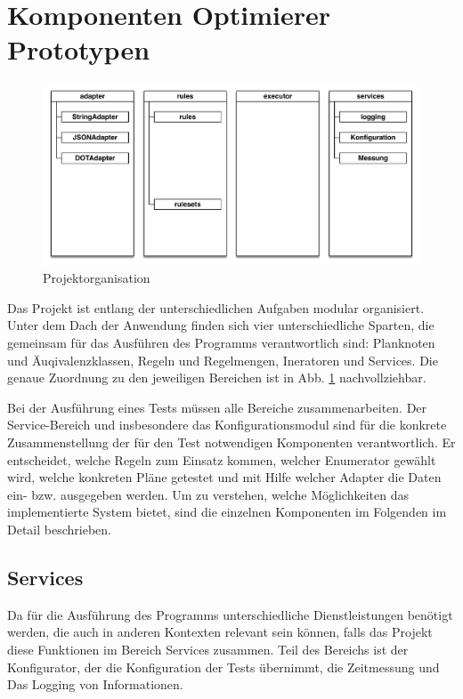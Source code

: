 \section{Komponenten Optimierer Prototypen}




\begin{figure}[ht]
  \centering
  \includegraphics[width=\textwidth]{04_Implementierung/00_media/Organization.pdf}
  \caption{Projektorganisation}
  \label{ProjectOrga}
\end{figure}


Das Projekt ist entlang der unterschiedlichen Aufgaben modular organisiert. Unter dem Dach der Anwendung finden sich vier unterschiedliche Sparten, die gemeinsam für das Ausführen des Programms verantwortlich sind: Planknoten und Äuqivalenzklassen, Regeln und Regelmengen, Ineratoren und Services. Die genaue Zuordnung zu den jeweiligen Bereichen ist in Abb. \ref{ProjectOrga} nachvollziehbar.




Bei der Ausführung eines Tests  müssen alle Bereiche zusammenarbeiten. Der Service-Bereich und insbesondere das Konfigurationsmodul sind für die konkrete Zusammenstellung der für den Test notwendigen Komponenten verantwortlich. Er entscheidet, welche Regeln zum Einsatz kommen, welcher Enumerator gewählt wird, welche konkreten Pläne getestet und mit Hilfe welcher Adapter die Daten ein-  bzw. ausgegeben werden. Um zu verstehen, welche Möglichkeiten das implementierte System bietet, sind die einzelnen Komponenten im Folgenden im Detail beschrieben.


\subsection{Services}
Da für die Ausführung des Programms unterschiedliche Dienstleistungen benötigt werden, die auch in anderen Kontexten relevant sein können, falls das Projekt diese Funktionen im Bereich Services zusammen. Teil des Bereichs ist der Konfigurator, der die Konfiguration der Tests übernimmt, die Zeitmessung und Das Logging von Informationen.

